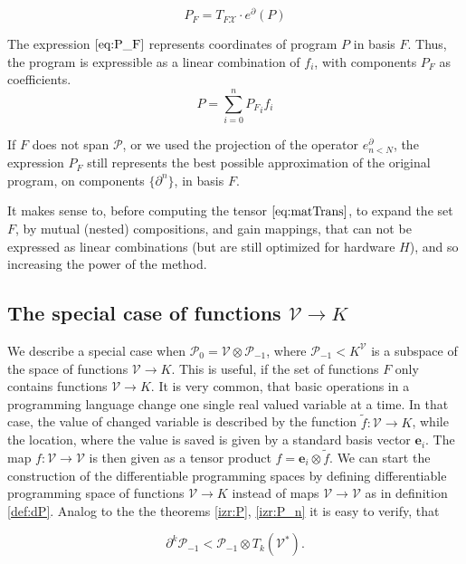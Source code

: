 \documentclass{article}
\newcommand{\VV}{\mathcal{V}}
\newcommand{\e}{\mathbf{e}}
\newcommand{\X}{\mathcal{X}}
\newcommand{\dP}{\mathcal{P}}
\newcommand{\D}{\partial}
\begin{document}
  \begin{equation}\label{eq:P_F}
  	P_F=T_{F\X}\cdot e^\D(P)
  \end{equation}
  
  The expression $\eqref{eq:P_F}$ represents coordinates of program $P$ in basis $F$. Thus, the program is expressible as a linear combination of $f_i$, with components $P_F$ as coefficients.
  \begin{equation}
  P=\sum\limits_{i=0}^{n}{P_F}_if_i
  \end{equation}
  
  If $F$ does not span $\dP$, or we used the projection of the operator $e^\D_{n<N}$, the expression $P_F$ still represents the best possible approximation of the original program, on components $\{\D^n\}$, in basis $F$.
  
  It makes sense to, before computing the tensor $\eqref{eq:matTrans}$, to expand the set $F$, by mutual (nested) compositions, and gain mappings, that can not be expressed as linear combinations (but are still optimized for hardware $H$), and so increasing the power of the method.
\subsection{The special case of functions $\VV\to K$}
We describe a special case when $\dP_0=\VV\otimes\dP_{-1}$, where
$\dP_{-1}<K^\VV$ is a subspace of the space of functions $\VV\to K$. This is
useful, if the set of functions $F$ only contains functions $\VV\to K$. It is
very common, that basic operations in a programming language change one single
real valued variable at a time. In that case, the value of changed variable is
described by the function $\tilde{f}:\VV\to K$, while the location, where the
value is saved is given by a standard basis vector $\e_i$. The map $f:\VV\to \VV$
is then given as a tensor product $f=\e_i\otimes \tilde{f}$. We can start the
construction of the differentiable programming spaces by defining differentiable
programming space of functions $\VV\to K$ instead of maps $\VV\to \VV$ as in
definition \ref{def:dP}.  Analog to the the theorems \ref{izr:P}, \ref{izr:P_n}
it is easy to verify, that

\begin{equation}
  \label{eq:tilda_dP}
  \D^k\dP_{-1} < \dP_{-1}\otimes T_k(\VV^*).
\end{equation}
\end{document}
